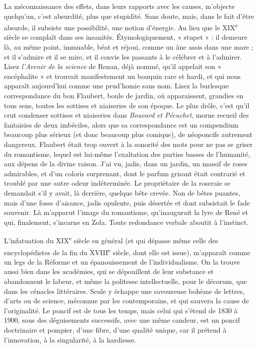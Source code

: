 \documentclass[french,twoside]{book} %
\begin{document}
La méconnaissance des effets, dans leurs rapports avec les causes, m’objecte quelqu’un, c’est absurdité, plus que stupidité. Sans doute, mais, dans le fait d’être absurde, il subsiste une possibilité, une notion d’énergie. Au lieu que le XIX\textsuperscript{e} siècle se complaît dans ses insanités. Étymologiquement, « stupet » : il demeure là, au même point, immuable, béat et réjoui, comme un âne assis dans une mare ; et il s’admire et il se mire, et il convie les passants à le célébrer et à l’admirer. Lisez {\itshape l’Avenir de la science} de Renan, déjà nommé, qu’il appelait son « encéphalite » et trouvait manifestement un bouquin rare et hardi, et qui nous apparaît aujourd’hui comme une prud’homie sans nom. Lisez la burlesque correspondance du bon Flaubert, boule de jardin, où apparaissent, grandies en tous sens, toutes les sottises et niaiseries de son époque. Le plus drôle, c’est qu’il crut condenser sottises et niaiseries dans {\itshape Bouvard et Pécuchet}, morne recueil des fantaisies de deux imbéciles, alors que sa correspondance est un compendium beaucoup plus sérieux (et donc beaucoup plus comique), de néoponcifs autrement dangereux. Flaubert était trop ouvert à la sonorité des mots pour ne pas se griser du romantisme, lequel est lui-même l’exaltation des parties basses de l’humanité, aux dépens de la divine raison. J’ai vu, jadis, dans un jardin, un massif de roses admirables, et d’un coloris surprenant, dont le parfum grisant était contrarié et troublé par une autre odeur indéterminée. Le propriétaire de la roseraie se demandait s’il y avait, là derrière, quelque bête crevée. Non de bêtes puantes, mais d’une fosse d’aisance, jadis opulente, puis désertée et dont subsistait le fade souvenir. Là m’apparut l’image du romantisme, qu’inaugurait la lyre de René et qui, finalement, s’incarne en Zola. Toute redondance verbale aboutit à l’instinct.\par
L’infatuation du XIX\textsuperscript{e} siècle en général (et qui dépasse même celle des encyclopédistes de la fin du XVIII\textsuperscript{e} siècle, dont elle est issue), m’apparaît comme un legs de la Réforme et un épanouissement de l’individualisme. On la trouve aussi bien dans les académies, qui se dépouillent de leur substance et abandonnent le labeur, et même la politesse intellectuelle, pour le décorum, que dans les cénacles littéraires. Seule y échappe une savoureuse bohème de lettres, d’arts ou de science, méconnue par les contemporains, et qui sauvera la cause de l’originalité. Le poncif est de tous les temps, mais celui qui s’étend de 1830 à 1900, sous des déguisements successifs, avec une même candeur, est un poncif doctrinaire et pompier, d’une fibre, d’une qualité unique, car il prétend à l’innovation, à la singularité, à la hardiesse.\par
\end{document}
